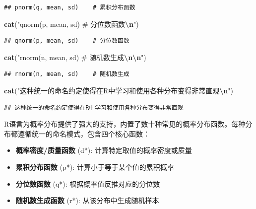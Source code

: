 \documentclass[
]{book}
\newenvironment{Shaded}{\begin{snugshade}}{\end{snugshade}}
\newcommand{\FunctionTok}[1]{\textcolor[rgb]{0.13,0.29,0.53}{\textbf{#1}}}
\newcommand{\NormalTok}[1]{#1}
\newcommand{\SpecialCharTok}[1]{\textcolor[rgb]{0.81,0.36,0.00}{\textbf{#1}}}
\newcommand{\StringTok}[1]{\textcolor[rgb]{0.31,0.60,0.02}{#1}}
\providecommand{\tightlist}{%
  \setlength{\itemsep}{0pt}\setlength{\parskip}{0pt}}
\begin{document}
\begin{verbatim}
## pnorm(q, mean, sd)    # 累积分布函数
\end{verbatim}

\begin{Shaded}
\begin{Highlighting}[]
\FunctionTok{cat}\NormalTok{(}\StringTok{"qnorm(p, mean, sd)    \# 分位数函数}\SpecialCharTok{\textbackslash{}n}\StringTok{"}\NormalTok{)}
\end{Highlighting}
\end{Shaded}

\begin{verbatim}
## qnorm(p, mean, sd)    # 分位数函数
\end{verbatim}

\begin{Shaded}
\begin{Highlighting}[]
\FunctionTok{cat}\NormalTok{(}\StringTok{"rnorm(n, mean, sd)    \# 随机数生成}\SpecialCharTok{\textbackslash{}n\textbackslash{}n}\StringTok{"}\NormalTok{)}
\end{Highlighting}
\end{Shaded}

\begin{verbatim}
## rnorm(n, mean, sd)    # 随机数生成
\end{verbatim}

\begin{Shaded}
\begin{Highlighting}[]
\FunctionTok{cat}\NormalTok{(}\StringTok{"这种统一的命名约定使得在R中学习和使用各种分布变得非常直观}\SpecialCharTok{\textbackslash{}n}\StringTok{"}\NormalTok{)}
\end{Highlighting}
\end{Shaded}

\begin{verbatim}
## 这种统一的命名约定使得在R中学习和使用各种分布变得非常直观
\end{verbatim}

R语言为概率分布提供了强大的支持，内置了数十种常见的概率分布函数。每种分布都遵循统一的命名模式，包含四个核心函数：

\begin{itemize}
\tightlist
\item
  \textbf{概率密度/质量函数} (d*): 计算特定取值的概率密度或质量
\item
  \textbf{累积分布函数} (p*): 计算小于等于某个值的累积概率
\item
  \textbf{分位数函数} (q*): 根据概率值反推对应的分位数
\item
  \textbf{随机数生成函数} (r*): 从该分布中生成随机样本
\end{itemize}
\end{document}

